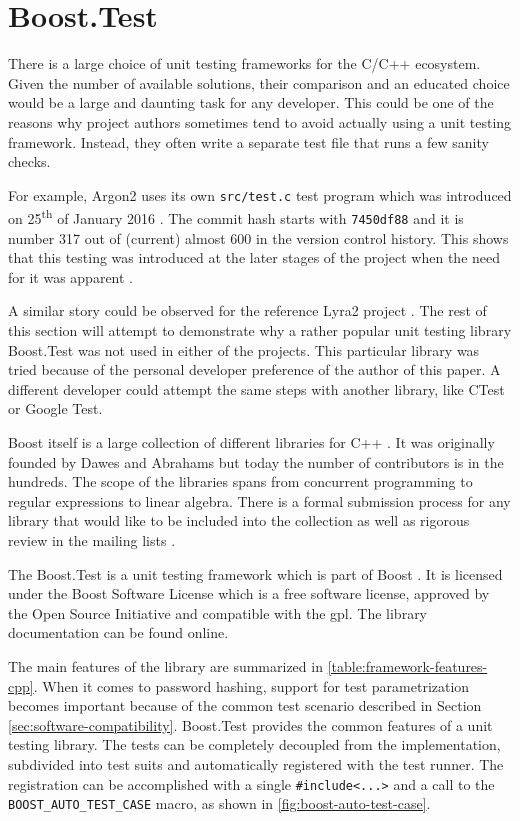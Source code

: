 \section{Boost.Test}
\label{sec:unit-boost-google}

There is a large choice of unit testing frameworks for the C/C++ ecosystem. Given the number of available solutions, their comparison and an educated choice would be a large and daunting task for any developer. This could be one of the reasons why project authors sometimes tend to avoid actually using a unit testing framework. Instead, they often write a separate test file that runs a few sanity checks.

For example, Argon2 uses its own \texttt{src/test.c} test program which was introduced on 25\textsuperscript{th} of January 2016 \cite{github:2017:argon2}. The commit hash starts with \texttt{7450df88} and it is number 317 out of (current) almost 600 in the version control history. This shows that this testing was introduced at the later stages of the project when the need for it was apparent \cite{github:2017:argon2-issue-85}.

A similar story could be observed for the reference Lyra2 project \cite{github:2017:lyra}. The rest of this section will attempt to demonstrate why a rather popular unit testing library Boost.Test was not used in either of the projects. This particular library was tried because of the personal developer preference of the author of this paper. A different developer could attempt the same steps with another library, like CTest or Google Test.

Boost itself is a large collection of different libraries for C++ \cite{boost:2017:homepage}. It was originally founded by Dawes and Abrahams but today the number of contributors is in the hundreds. The scope of the libraries spans from concurrent programming to regular expressions to linear algebra. There is a formal submission process for any library that would like to be included into the collection \cite{boost:2017:submission-process} as well as rigorous review in the mailing lists \cite{boost:2017:mailing-list}.

The Boost.Test is a unit testing framework which is part of Boost \cite{boost:2017:test-docs}. It is licensed under the Boost Software License which is a free software license, approved by the Open Source Initiative and compatible with the \gls{gpl}. The library documentation can be found online.

The main features of the library are summarized in \autoref{table:framework-features-cpp}. When it comes to password hashing, support for test parametrization becomes important because of the common test scenario described in Section \ref{sec:software-compatibility}. Boost.Test provides the common features of a unit testing library. The tests can be completely decoupled from the implementation, subdivided  into test suits and automatically registered with the test runner. The registration can be accomplished with a single \texttt{\#include<...>} and a call to the \texttt{BOOST\_AUTO\_TEST\_CASE} macro, as shown in \autoref{fig:boost-auto-test-case}.

